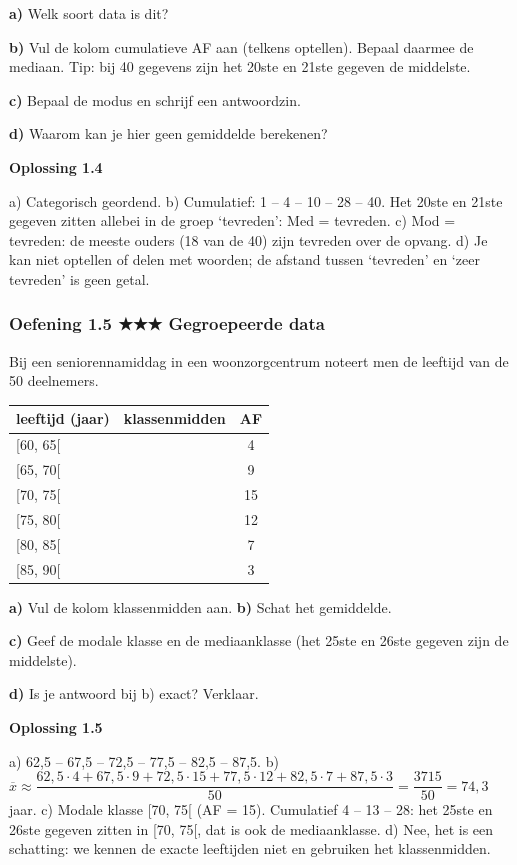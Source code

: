 \textbf{a)} Welk soort data is dit? \lijn

\textbf{b)} Vul de kolom cumulatieve AF aan (telkens optellen). Bepaal daarmee de mediaan. Tip: bij 40 gegevens zijn het 20ste en 21ste gegeven de middelste. \lijn

\textbf{c)} Bepaal de modus en schrijf een antwoordzin. \lijn

\textbf{d)} Waarom kan je hier geen gemiddelde berekenen? \lijn

\begin{oplossing}
\textbf{Oplossing 1.4}

a) Categorisch geordend. b) Cumulatief: 1 – 4 – 10 – 28 – 40. Het 20ste en 21ste gegeven zitten allebei in de groep ‘tevreden’: Med = tevreden. c) Mod = tevreden: de meeste ouders (18 van de 40) zijn tevreden over de opvang. d) Je kan niet optellen of delen met woorden; de afstand tussen ‘tevreden’ en ‘zeer tevreden’ is geen getal.
\end{oplossing}

\subsubsection*{Oefening 1.5 \quad ★★★ \quad Gegroepeerde data}

Bij een seniorennamiddag in een woonzorgcentrum noteert men de leeftijd van de 50 deelnemers.

\begin{tabular}{lcc}
\hline
leeftijd (jaar) & klassenmidden & AF \\
\hline
[60, 65[ & & 4 \\
[65, 70[ & & 9 \\
[70, 75[ & & 15 \\
[75, 80[ & & 12 \\
[80, 85[ & & 7 \\
[85, 90[ & & 3 \\
\hline
\end{tabular}

\textbf{a)} Vul de kolom klassenmidden aan. \quad \textbf{b)} Schat het gemiddelde. \lijn

\textbf{c)} Geef de modale klasse en de mediaanklasse (het 25ste en 26ste gegeven zijn de middelste). \lijn

\textbf{d)} Is je antwoord bij b) exact? Verklaar. \lijn

\begin{oplossing}
\textbf{Oplossing 1.5}

a) 62,5 – 67,5 – 72,5 – 77,5 – 82,5 – 87,5. b) $\overline{x}\approx\dfrac{62{,}5\cdot 4+67{,}5\cdot 9+72{,}5\cdot 15+77{,}5\cdot 12+82{,}5\cdot 7+87{,}5\cdot 3}{50}=\dfrac{3715}{50}=74{,}3$ jaar. c) Modale klasse [70, 75[ (AF = 15). Cumulatief 4 – 13 – 28: het 25ste en 26ste gegeven zitten in [70, 75[, dat is ook de mediaanklasse. d) Nee, het is een schatting: we kennen de exacte leeftijden niet en gebruiken het klassenmidden.
\end{oplossing}

